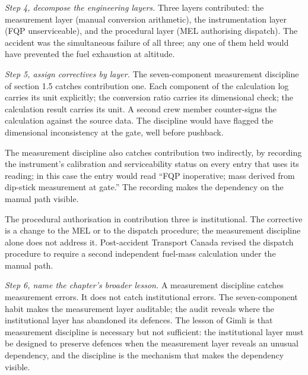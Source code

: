 \begin{exercise}
\textit{Step 4, decompose the engineering layers.} Three layers
contributed: the measurement layer (manual conversion arithmetic),
the instrumentation layer (FQP unserviceable), and the procedural
layer (MEL authorising dispatch). The accident was the simultaneous
failure of all three; any one of them held would have prevented the
fuel exhaustion at altitude.

\textit{Step 5, assign correctives by layer.} The seven-component
measurement discipline of section 1.5 catches contribution one. Each
component of the calculation log carries its unit explicitly; the
conversion ratio carries its dimensional check; the calculation
result carries its unit. A second crew member counter-signs the
calculation against the source data. The discipline would have
flagged the dimensional inconsistency at the gate, well before
pushback.

The measurement discipline also catches contribution two indirectly,
by recording the instrument's calibration and serviceability status
on every entry that uses its reading; in this case the entry would
read ``FQP inoperative; mass derived from dip-stick measurement at
gate.'' The recording makes the dependency on the manual path
visible.

The procedural authorisation in contribution three is institutional.
The corrective is a change to the MEL or to the dispatch procedure;
the measurement discipline alone does not address it. Post-accident
Transport Canada revised the dispatch procedure to require a second
independent fuel-mass calculation under the manual path.

\textit{Step 6, name the chapter's broader lesson.} A measurement
discipline catches measurement errors. It does not catch institutional
errors. The seven-component habit makes the measurement layer
auditable; the audit reveals where the institutional layer has
abandoned its defences. The lesson of Gimli is that measurement
discipline is necessary but not sufficient: the institutional layer
must be designed to preserve defences when the measurement layer
reveals an unusual dependency, and the discipline is the mechanism
that makes the dependency visible.
\end{exercise}

